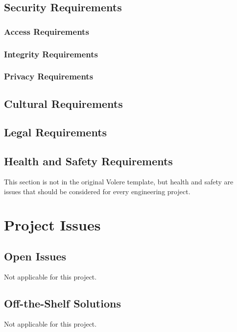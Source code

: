 \documentclass[12pt, titlepage]{article}
\begin{document}
\subsection{Security Requirements}

\subsubsection{Access Requirements}

\subsubsection{Integrity Requirements}

\subsubsection{Privacy Requirements}

\subsection{Cultural Requirements}

\subsection{Legal Requirements}

\subsection{Health and Safety Requirements}

This section is not in the original Volere template, but health and safety are
issues that should be considered for every engineering project.

\section{Project Issues}

\subsection{Open Issues}
Not applicable for this project.

\subsection{Off-the-Shelf Solutions}
Not applicable for this project.
\end{document}
